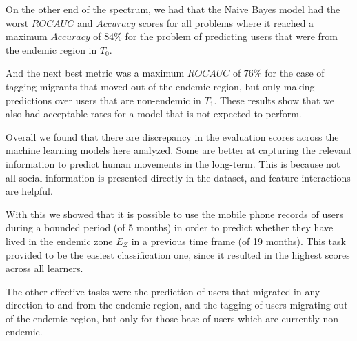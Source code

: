 On the other end of the spectrum, we had that the Naive Bayes model had the worst $ROC AUC$ and $Accuracy$ scores for all problems where it reached a maximum $Accuracy$ of $84\%$ for the problem of predicting users that were from the endemic region in $T_0$.

And the next best metric was a maximum $ROC AUC$ of $76\%$ for the case of tagging migrants that moved out of the endemic region, but only making predictions over users that are non-endemic in $T_1$.
These results show that we also had acceptable rates for a model that is not expected to perform.

Overall we found that there are discrepancy in the evaluation scores across the machine learning models here analyzed.
Some are better at capturing the relevant information to predict human movements in the long-term.
This is because not all social information is presented directly in the dataset, and feature interactions are helpful.

With this we showed that it is possible to use the mobile phone records of users during a bounded period (of 5 months) in order to predict whether they have lived in the endemic zone $E_Z$ in a previous time frame (of 19 months).
This task provided to be the easiest classification one, since it resulted in the highest scores across all learners.

The other effective tasks were the prediction of users that migrated in any direction to and from the endemic region, and the tagging of users migrating out of the endemic region, but only for those base of users which are currently non endemic.





